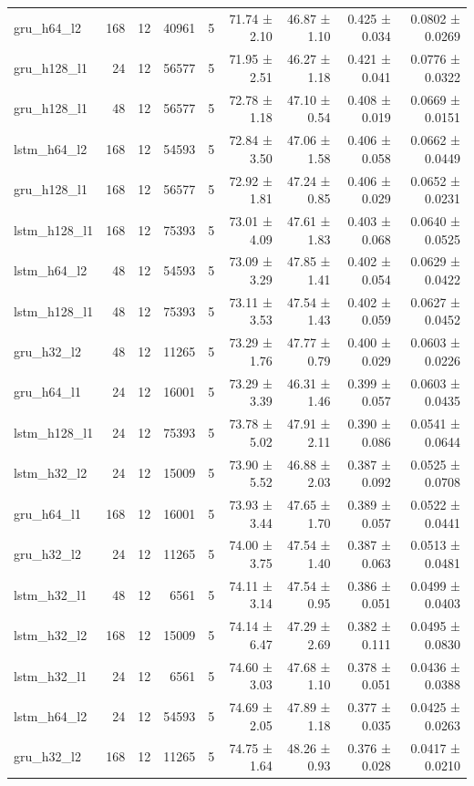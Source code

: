 \begin{table}[htbp]
\begin{tabular}{lrrrrrrrr}
gru\_h64\_l2 & 168 & 12 & 40961 & 5 & 71.74 ± 2.10 & 46.87 ± 1.10 & 0.425 ± 0.034 & 0.0802 ± 0.0269 \\
gru\_h128\_l1 & 24 & 12 & 56577 & 5 & 71.95 ± 2.51 & 46.27 ± 1.18 & 0.421 ± 0.041 & 0.0776 ± 0.0322 \\
gru\_h128\_l1 & 48 & 12 & 56577 & 5 & 72.78 ± 1.18 & 47.10 ± 0.54 & 0.408 ± 0.019 & 0.0669 ± 0.0151 \\
lstm\_h64\_l2 & 168 & 12 & 54593 & 5 & 72.84 ± 3.50 & 47.06 ± 1.58 & 0.406 ± 0.058 & 0.0662 ± 0.0449 \\
gru\_h128\_l1 & 168 & 12 & 56577 & 5 & 72.92 ± 1.81 & 47.24 ± 0.85 & 0.406 ± 0.029 & 0.0652 ± 0.0231 \\
lstm\_h128\_l1 & 168 & 12 & 75393 & 5 & 73.01 ± 4.09 & 47.61 ± 1.83 & 0.403 ± 0.068 & 0.0640 ± 0.0525 \\
lstm\_h64\_l2 & 48 & 12 & 54593 & 5 & 73.09 ± 3.29 & 47.85 ± 1.41 & 0.402 ± 0.054 & 0.0629 ± 0.0422 \\
lstm\_h128\_l1 & 48 & 12 & 75393 & 5 & 73.11 ± 3.53 & 47.54 ± 1.43 & 0.402 ± 0.059 & 0.0627 ± 0.0452 \\
gru\_h32\_l2 & 48 & 12 & 11265 & 5 & 73.29 ± 1.76 & 47.77 ± 0.79 & 0.400 ± 0.029 & 0.0603 ± 0.0226 \\
gru\_h64\_l1 & 24 & 12 & 16001 & 5 & 73.29 ± 3.39 & 46.31 ± 1.46 & 0.399 ± 0.057 & 0.0603 ± 0.0435 \\
lstm\_h128\_l1 & 24 & 12 & 75393 & 5 & 73.78 ± 5.02 & 47.91 ± 2.11 & 0.390 ± 0.086 & 0.0541 ± 0.0644 \\
lstm\_h32\_l2 & 24 & 12 & 15009 & 5 & 73.90 ± 5.52 & 46.88 ± 2.03 & 0.387 ± 0.092 & 0.0525 ± 0.0708 \\
gru\_h64\_l1 & 168 & 12 & 16001 & 5 & 73.93 ± 3.44 & 47.65 ± 1.70 & 0.389 ± 0.057 & 0.0522 ± 0.0441 \\
gru\_h32\_l2 & 24 & 12 & 11265 & 5 & 74.00 ± 3.75 & 47.54 ± 1.40 & 0.387 ± 0.063 & 0.0513 ± 0.0481 \\
lstm\_h32\_l1 & 48 & 12 & 6561 & 5 & 74.11 ± 3.14 & 47.54 ± 0.95 & 0.386 ± 0.051 & 0.0499 ± 0.0403 \\
lstm\_h32\_l2 & 168 & 12 & 15009 & 5 & 74.14 ± 6.47 & 47.29 ± 2.69 & 0.382 ± 0.111 & 0.0495 ± 0.0830 \\
lstm\_h32\_l1 & 24 & 12 & 6561 & 5 & 74.60 ± 3.03 & 47.68 ± 1.10 & 0.378 ± 0.051 & 0.0436 ± 0.0388 \\
lstm\_h64\_l2 & 24 & 12 & 54593 & 5 & 74.69 ± 2.05 & 47.89 ± 1.18 & 0.377 ± 0.035 & 0.0425 ± 0.0263 \\
gru\_h32\_l2 & 168 & 12 & 11265 & 5 & 74.75 ± 1.64 & 48.26 ± 0.93 & 0.376 ± 0.028 & 0.0417 ± 0.0210 \\

\end{tabular}
\end{table}
